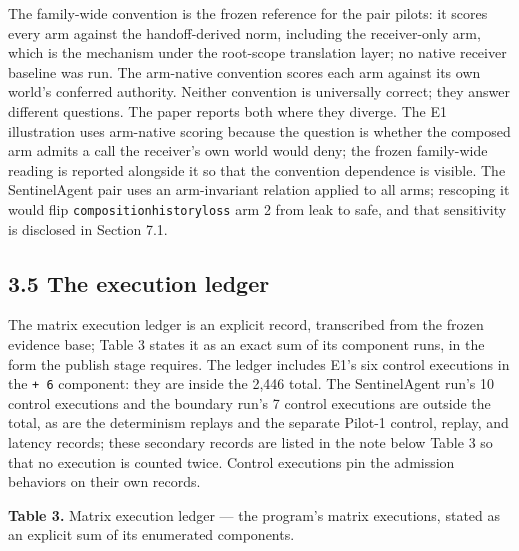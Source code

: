 \documentclass[
  10pt,
]{article}
\let\origtexttt\texttt
\renewcommand{\texttt}[1]{{\upshape\origtexttt{#1}}}
\renewcommand{\_}{\allowbreak\origunderscore}
\begin{document}
The family-wide convention is the frozen reference for the pair pilots:
it scores every arm against the handoff-derived norm, including the
receiver-only arm, which is the mechanism under the root-scope
translation layer; no native receiver baseline was run. The arm-native
convention scores each arm against its own world's conferred authority.
Neither convention is universally correct; they answer different
questions. The paper reports both where they diverge. The E1
illustration uses arm-native scoring because the question is whether the
composed arm admits a call the receiver's own world would deny; the
frozen family-wide reading is reported alongside it so that the
convention dependence is visible. The SentinelAgent pair uses an
arm-invariant relation applied to all arms; rescoping it would flip
\texttt{composition\_history\_loss} arm 2 from leak to safe, and that
sensitivity is disclosed in Section 7.1.

\subsection{3.5 The execution ledger}\label{the-execution-ledger}

The matrix execution ledger is an explicit record, transcribed from the
frozen evidence base; Table 3 states it as an exact sum of its component
runs, in the form the publish stage requires. The ledger includes E1's
six control executions in the \texttt{+\ 6} component: they are inside
the 2,446 total. The SentinelAgent run's 10 control executions and the
boundary run's 7 control executions are outside the total, as are the
determinism replays and the separate Pilot-1 control, replay, and
latency records; these secondary records are listed in the note below
Table 3 so that no execution is counted twice. Control executions pin
the admission behaviors on their own records.

\textbf{Table 3.} Matrix execution ledger --- the program's matrix
executions, stated as an explicit sum of its enumerated components.
\end{document}
